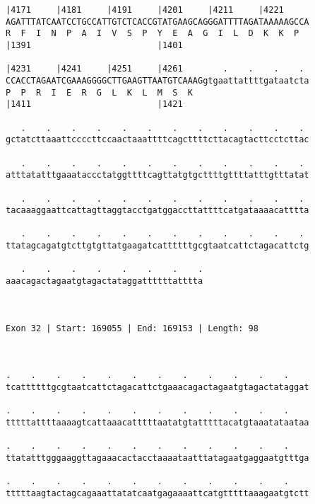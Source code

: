 \documentclass{article}
\begin{document}
\begin{Verbatim}
|4171     |4181     |4191     |4201     |4211     |4221     
AGATTTATCAATCCTGCCATTGTCTCACCGTATGAAGCAGGGATTTTAGATAAAAAGCCA
R  F  I  N  P  A  I  V  S  P  Y  E  A  G  I  L  D  K  K  P  
|1391                         |1401                         
  
|4231     |4241     |4251     |4261        .    .    .    . 
CCACCTAGAATCGAAAGGGGCTTGAAGTTAATGTCAAAGgtgaattattttgataatcta
P  P  R  I  E  R  G  L  K  L  M  S  K                       
|1411                         |1421                         
  
   .    .    .    .    .    .    .    .    .    .    .    . 
gctatcttaaattccccttccaactaaattttcagcttttcttacagtacttcctcttac
                                                            
   .    .    .    .    .    .    .    .    .    .    .    . 
atttatatttgaaataccctatggttttcagttatgtgcttttgttttatttgtttatat
                                                            
   .    .    .    .    .    .    .    .    .    .    .    . 
tacaaaggaattcattagttaggtacctgatggaccttattttcatgataaaacatttta
                                                            
   .    .    .    .    .    .    .    .    .    .    .    . 
ttatagcagatgtcttgtgttatgaagatcattttttgcgtaatcattctagacattctg
                                                            
   .    .    .    .    .    .    .    .
aaacagactagaatgtagactataggattttttatttta
                                       
                                       
 
Exon 32 | Start: 169055 | End: 169153 | Length: 98



.    .    .    .    .    .    .    .    .    .    .    .    
tcattttttgcgtaatcattctagacattctgaaacagactagaatgtagactataggat
                                                            
.    .    .    .    .    .    .    .    .    .    .    .    
tttttattttaaaagtcattaaacatttttaatatgtatttttacatgtaaatataataa
                                                            
.    .    .    .    .    .    .    .    .    .    .    .    
ttatatttgggaaggttagaaacactacctaaaataatttatagaatgaggaatgtttga
                                                            
.    .    .    .    .    .    .    .    .    .    .    .    
tttttaagtactagcagaaattatatcaatgagaaaattcatgtttttaaagaatgtctt
                                                            

\end{Verbatim}
\end{document}
